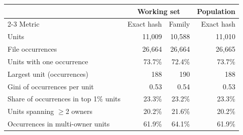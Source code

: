 \begin{tabular}{lrrr}
\toprule
 & \multicolumn{2}{c}{Working set} & Population \\
\cmidrule(lr){2-3}
Metric & Exact hash & Family & Exact hash \\
\midrule
Units & 11,009 & 10,588 & 11,010 \\
File occurrences & 26,664 & 26,664 & 26,665 \\
Units with one occurrence & 73.7\% & 72.4\% & 73.7\% \\
Largest unit (occurrences) & 188 & 190 & 188 \\
Gini of occurrences per unit & 0.53 & 0.54 & 0.53 \\
Share of occurrences in top 1\% units & 23.3\% & 23.2\% & 23.3\% \\
Units spanning $\geq$2 owners & 20.2\% & 21.6\% & 20.2\% \\
Occurrences in multi-owner units & 61.9\% & 64.1\% & 61.9\% \\
\bottomrule
\end{tabular}
